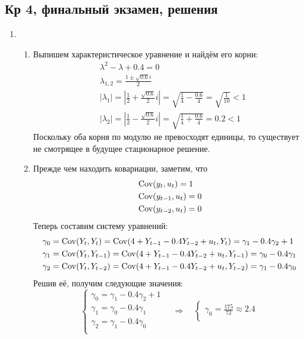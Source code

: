 \documentclass[12pt, a4paper]{article}
\theoremstyle{definition}
\begin{document}
\subsection{Кр 4, финальный экзамен, решения}

\begin{enumerate}
\item
\begin{enumerate}
\item Выпишем характеристическое уравнение и найдём его корни:
\begin{align*}
& \lambda^2 - \lambda + 0.4 = 0 \\
& \lambda_{1,2} = \frac{1 \pm \sqrt{0.6} i}{2} \\
& |\lambda_1| = \left| \frac{1}{2} + \frac{\sqrt{0.6}}{2} i \right| = \sqrt{\frac{1}{4} - \frac{0.6}{4}} = \sqrt{\frac{1}{10}} < 1 \\
& |\lambda_2| = \left| \frac{1}{2} - \frac{\sqrt{0.6}}{2} i \right| = \sqrt{\frac{1}{4} + \frac{0.6}{4}} = 0.2 < 1
\end{align*}
Поскольку оба корня по модулю не превосходят единицы, то существует не смотрящее в будущее
стационарное решение.
\item Прежде чем находить ковариации, заметим, что
\begin{align*}
& \operatorname{Cov}(y_t, u_t) = 1 \\
& \operatorname{Cov}(y_{t-1}, u_t) = 0 \\
& \operatorname{Cov}(y_{t-2}, u_t) = 0
\end{align*}
Теперь составим систему уравнений:
\begin{align*}
\gamma_0 &= \operatorname{Cov}(Y_t, Y_t) = \operatorname{Cov}(4 + Y_{t-1} - 0.4 Y_{t-2} + u_t, Y_t) = \gamma_1 - 0.4 \gamma_2 + 1 \\
\gamma_1 &= \operatorname{Cov}(Y_t, Y_{t-1}) = \operatorname{Cov}(4 + Y_{t-1} - 0.4 Y_{t-2} + u_t, Y_{t-1}) = \gamma_0 - 0.4 \gamma_1 \\
\gamma_2 &= \operatorname{Cov}(Y_t, Y_{t-2}) = \operatorname{Cov}(4 + Y_{t-1} - 0.4 Y_{t-2} + u_t, Y_{t-2}) = \gamma_1 - 0.4 \gamma_0
\end{align*}
Решив её, получим следующие значения:
\[
\begin{cases}
\gamma_0 = \gamma_1 - 0.4 \gamma_2 + 1 \\
\gamma_1 = \gamma_0 - 0.4 \gamma_1 \\
\gamma_2 = \gamma_1 - 0.4 \gamma_0 \\
\end{cases}
\quad \Rightarrow \quad
\begin{cases}
\gamma_0 = \frac{175}{72} \approx 2.4 \\

\end{cases}\]
\end{enumerate}
\end{enumerate}
\end{document}
